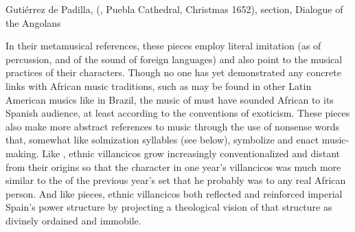 
{Gutiérrez de Padilla,  
(, Puebla Cathedral, Christmas 1652), 
section, Dialogue of the Angolans}

In their metamusical references, these pieces employ literal
imitation (as of percussion, and of the  sound of foreign
languages) and also point to the musical practices of their characters.
Though no one has yet demonstrated any concrete links with African music
traditions, such as may be found in other Latin American musics like
 in Brazil, the music of  must have
sounded African to its Spanish audience, at least according to the conventions
of exoticism.%
    \Autocite{Kubik:AngolanTraits} %
These pieces also make more abstract references to music through the use of
nonsense words that, somewhat like solmization syllables (see below), symbolize
and enact music-making.
Like , ethnic villancicos grow increasingly conventionalized and
distant from their origins so that the  character in one year's
villancicos was much more similar to the  of the previous year's
set that he probably was to any real African person.
And like  pieces, ethnic villancicos both reflected and reinforced
imperial Spain's power structure by projecting a theological vision of that
structure as divinely ordained and immobile.

